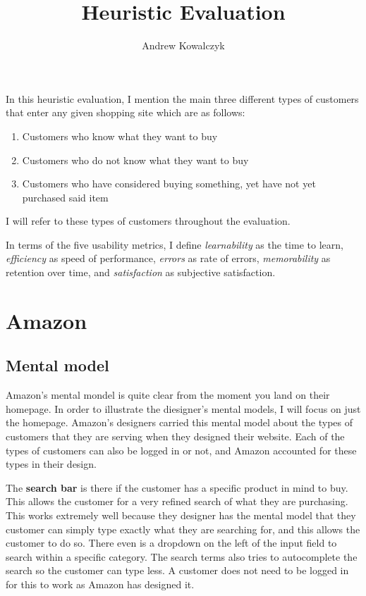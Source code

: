 \documentclass[11pt, oneside]{article}
\title{Heuristic Evaluation}
\author{Andrew Kowalczyk}
\begin{document}
\maketitle

In this heuristic evaluation, I mention the main three different types of customers that enter any given shopping site which are as follows:
\begin{enumerate}
\item Customers who know what they want to buy 
\item Customers who do not know what they want to buy
\item Customers who have considered buying something, yet have not yet purchased said item
\end{enumerate}
I will refer to these types of customers throughout the evaluation.

In terms of the five usability metrics, I define \textit{learnability} as the time to learn, \textit{efficiency} as speed of performance, \textit{errors} as rate of errors, \textit{memorability} as retention over time, and \textit{satisfaction} as subjective satisfaction.
\pagebreak

\section{Amazon}

\subsection{Mental model}

Amazon's mental mondel is quite clear from the moment you land on their homepage. In order to illustrate the diesigner's mental models, I will focus on just the homepage.
Amazon's designers carried this mental model about the types of customers that they are serving when they designed their website. Each of the types of customers can also be logged in or not, and Amazon accounted for these types in their design.

The \textbf{search bar} is there if the customer has a specific product in mind to buy. This allows the customer for a very refined search of what they are purchasing. This works extremely well because they designer has the mental model that they customer can simply type exactly what they are searching for, and this allows the customer to do so. There even is a dropdown on the left of the input field to search within a specific category. The search terms also tries to autocomplete the search so the customer can type less. A customer does not need to be logged in for this to work as Amazon has designed it.
\end{document}
